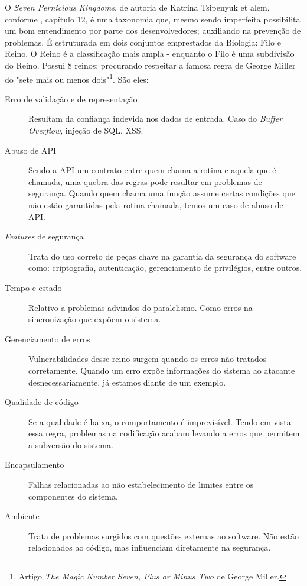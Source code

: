 			
			O \textsl{Seven Pernicious Kingdoms}, de autoria de Katrina Tsipenyuk et alem, conforme
			\cite{McGraw2006}, capítulo 12, é uma taxonomia que, mesmo sendo imperfeita possibilita
			um bom entendimento por parte dos desenvolvedores; auxiliando na prevenção de problemas.
			É estruturada em dois conjuntos emprestados da Biologia: Filo e Reino.
			O Reino é a classificação mais ampla - enquanto o Filo é uma subdivisão do Reino.
			Possui 8 reinos; procurando respeitar a famosa regra de George Miller 
			do "sete mais ou menos dois"\footnote{Artigo 
			\textsl{The Magic Number Seven, Plus or Minus Two} de George Miller.}. São eles:
			\begin{description}
				\item[Erro de validação e de representação]{Resultam da confiança
					indevida nos dados de entrada. Caso do \textsl{Buffer Overflow},
					injeção de SQL, XSS.}
				\item[Abuso de API]{Sendo a API um contrato entre quem chama a rotina
					e aquela que é chamada, uma quebra das regras pode resultar em problemas de segurança.
					Quando quem chama uma função assume certas condições que não estão garantidas
					pela rotina chamada, temos um caso de abuso de API.}
				\item[\textsl{Features} de segurança]{Trata do uso correto de peças chave na
					garantia da segurança do software como: criptografia, autenticação, gerenciamento
					de privilégios, entre outros.}
				\item[Tempo e estado]{Relativo a problemas advindos do paralelismo. Como erros
					na sincronização que expõem o sistema.}
				\item[Gerenciamento de erros]{Vulnerabilidades desse reino surgem quando
					os erros não tratados corretamente. Quando um erro expõe informações
					do sistema ao atacante desnecessariamente, já estamos diante de um exemplo.}
				\item[Qualidade de código]{Se a qualidade é baixa, o comportamento é imprevisível.
					Tendo em vista essa regra, problemas na codificação acabam levando
					a erros que permitem a subversão do sistema.}
				\item[Encapsulamento]{Falhas relacionadas ao não estabelecimento de limites entre os 
					componentes do sistema.}
				\item[Ambiente]{Trata de problemas surgidos com questões externas ao software.
					Não estão relacionados ao código, mas influenciam diretamente na segurança.}
			\end{description}
			

